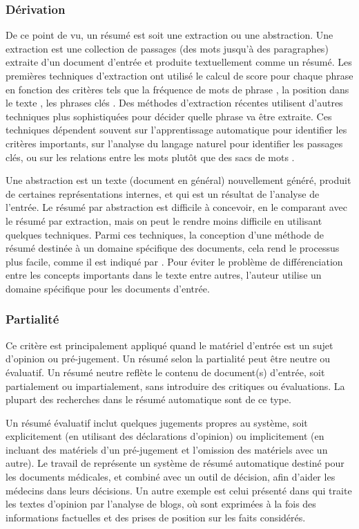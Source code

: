 \documentclass[a4paper,12pt,oneside]{../use/ESIthesis}
\begin{document}
\subsubsection{Dérivation}

De ce point de vu, un résumé est soit une extraction ou une abstraction. 
Une extraction est une collection de passages (des mots jusqu'à des paragraphes) extraite d'un document d'entrée et produite textuellement comme un résumé. 
Les premières techniques d'extraction ont utilisé le calcul de score pour chaque phrase en fonction des critères tels que la fréquence de mots de phrase \cite{58-luhn}, la position dans le texte \cite{58-baxendale,69-edmundson}, les phrases clés \cite{69-edmundson}. 
Des méthodes d'extraction récentes utilisent d'autres techniques plus sophistiquées pour décider quelle phrase va être extraite. 
Ces techniques dépendent souvent sur l'apprentissage automatique pour identifier les critères importants, sur l'analyse du langage naturel pour identifier les passages clés, ou sur les relations entre les mots plutôt que des sacs de mots \cite{02-radev-al}.

Une abstraction est un texte (document en général) nouvellement généré, produit de certaines représentations internes, et qui est un résultat de l'analyse de l'entrée. 
Le résumé par abstraction est difficile à concevoir, en le comparant avec le résumé par extraction, mais on peut le rendre moins difficile en utilisant quelques techniques. 
Parmi ces techniques, la conception d'une méthode de résumé destinée à un domaine spécifique des documents, cela rend le processus plus facile, comme il est indiqué par \cite{93-mitkov}. 
Pour éviter le problème de différenciation entre les concepts importants dans le texte entre autres, l'auteur utilise un domaine spécifique pour les documents d'entrée.

\subsubsection{Partialité}

Ce critère est principalement appliqué quand le matériel d'entrée est un sujet d'opinion ou pré-jugement. 
Un résumé selon la partialité peut être neutre ou évaluatif. 
Un résumé neutre reflète le contenu de document(s) d'entrée, soit partialement ou impartialement, sans introduire des critiques ou évaluations. 
La plupart des recherches dans le résumé automatique sont de ce type.

Un résumé évaluatif inclut quelques jugements propres au système, soit explicitement (en utilisant des déclarations d'opinion) ou implicitement (en incluant des matériels d'un pré-jugement et l'omission des matériels avec un autre). 
Le travail de \cite{12-workman-al} représente un système de résumé automatique destiné pour les documents médicales, et combiné avec un outil de décision, afin d'aider les médecins dans leurs décisions. 
Un autre exemple est celui présenté dans \cite{09-genereux-bossard} qui traite les textes d'opinion par l'analyse de blogs, où sont exprimées à la fois des informations factuelles et des prises de position sur les faits considérés.
\end{document}

